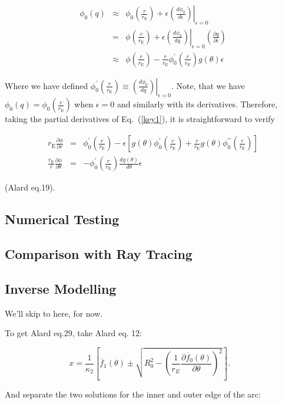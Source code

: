 \documentclass{article}
\def\be{\begin{equation}}
\def\ee{\end{equation}}
\newcommand{\eps}{\epsilon}
\def \eps {\epsilon}
\def \te {\theta}
\def \rre {\frac{r}{r_{\mathrm{E}}}}
\def \pa {\partial}
\def \prre {\left( \rre\right)}
\begin{document}
\def\dpdq{ \left. \left( \frac{d\phi_0}{dq}\right) \right|_{\eps=0} }
\def\dpde{ \left. \left( \frac{d\phi_0}{d\eps}\right) \right|_{\eps=0} }

\begin{eqnarray}
 \phi_0(q) &\approx& \phi_0\prre+\eps \dpde \\
	  & = & \phi\prre+\eps \dpdq  \left(\frac{\pa q}{\pa \eps}\right)\\
	  &\approx& \phi\prre-\rre\phi_0^\prime\prre g(\te)\eps \label{key1}
\end{eqnarray}

Where we have defined $\phi_0^\prime\prre \equiv  \dpdq$.  Note, that we have $\phi_0(q)=\phi_0\prre$ when $\eps=0$ and similarly with its derivatives. Therefore,
taking the partial derivatives of Eq.~(\ref{key1}), it is straightforward to verify

\begin{eqnarray}
 r_{\mathrm{E}}\frac{\pa \phi}{\pa r}&=& \phi_0^\prime\prre -%
  \eps\left[g(\te)\phi_0^\prime\prre+\rre g(\te)\phi_0^{\prime \prime}\prre\right]\\
\frac{r_{\mathrm{E}}}{r}\frac{\pa \phi}{\pa \te}&=&-\phi_0^\prime\prre \frac{dg(\te)}{d\te}\eps
\end{eqnarray}

(Alard eq.19).

\subsection{Numerical Testing}

\subsection{Comparison with Ray Tracing}

\subsection{Inverse Modelling}

We'll skip to here, for now.

To get Alard eq.29, take Alard eq. 12:


\be
x = \frac{1}{\kappa_2}\left[ \overline{f}_{1}(\theta) \pm \sqrt{R_0^2 - \left( \frac{1}{r_E}\frac{\partial \overline{f}_0(\theta)}{\partial \theta} \right)^2} \right]. \;\;\; 
\ee

And separate the two solutions for the inner and outer edge of the arc:
\end{document}
